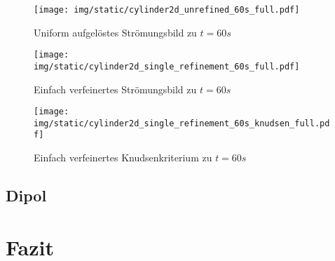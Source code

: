 \begin{figure}[h]
\begin{adjustbox}{center}
\texttt{[image: img/static/cylinder2d\_unrefined\_60s\_full.pdf]}
\end{adjustbox}
\caption{Uniform aufgelöstes Strömungsbild zu \(t=60s\)}
\end{figure}

\begin{figure}[h]
\begin{adjustbox}{center}
\texttt{[image: img/static/cylinder2d\_single\_refinement\_60s\_full.pdf]}
\end{adjustbox}
\caption{Einfach verfeinertes Strömungsbild zu \(t=60s\)}
\end{figure}

\begin{figure}[h]
\begin{adjustbox}{center}
\texttt{[image: img/static/cylinder2d\_single\_refinement\_60s\_knudsen\_full.pdf]}
\end{adjustbox}
\caption{Einfach verfeinertes Knudsenkriterium zu \(t=60s\)}
\end{figure}

\subsection{Dipol}

\newpage
\section{Fazit}
